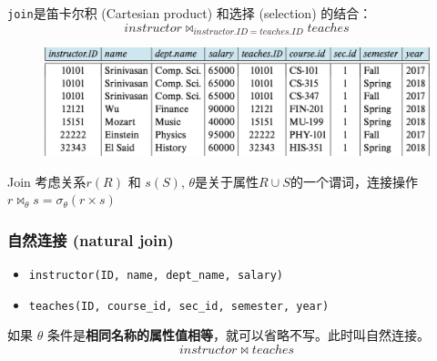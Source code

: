 \documentclass[aspectratio=169, 14pt]{beamer}
\begin{document}
\begin{frame}
    \texttt{join}是笛卡尔积 (Cartesian product) 和选择 (selection) 的结合：
    {\large \[instructor \Join_{instructor.ID=teaches.ID} teaches\]}
    \begin{figure}
        \includegraphics[width=.8\textwidth]{table/join2}
    \end{figure}

\begin{exampleblock}{Join}
    考虑关系$r(R)$ 和 $s(S)$, $\theta$是关于属性$R \cup S$的一个谓词，连接操作$r \Join_{\theta} s= \sigma_{\theta}(r \times s)$
\end{exampleblock}  
\end{frame}

\begin{frame}
    \frametitle{自然连接 (natural join)}
    \begin{itemize}
        \item \texttt{instructor(ID, name, dept\_name, salary)}
        \item \texttt{teaches(ID, course\_id, sec\_id, semester, year)}
       \end{itemize} 

如果 $\theta$ 条件是\textbf{相同名称的属性值相等}，就可以省略不写。此时叫\alert{自然连接}。    
{\large \[instructor \Join teaches \]}

\end{frame}
\end{document}
